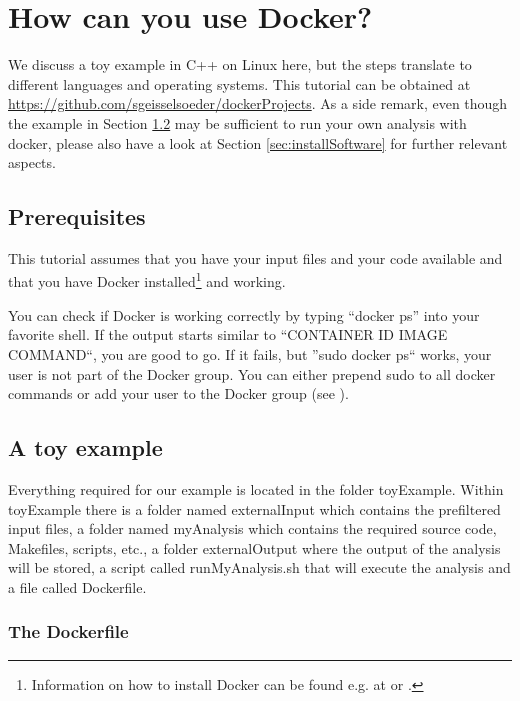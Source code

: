 \documentclass[a4paper, twoside, 11pt]{article}
\begin{document}
\section{How can you use Docker?}

We discuss a toy example in C++ on Linux here, 
but the steps translate to different languages and operating systems. 
This tutorial can be obtained at \url{https://github.com/sgeisselsoeder/dockerProjects}. 
As a side remark, even though the example in Section \ref{sec:toyexample} 
may be sufficient to run your own analysis with docker, 
please also have a look at Section \ref{sec:installSoftware}  
for further relevant aspects.

\subsection{Prerequisites}
\label{sec:isDockerRunning}

This tutorial assumes that you have your input files and your code available and that you have Docker 
installed\footnote{Information on how to install Docker can be found e.g. at 
\cite{digoc:install}
or \cite{dock:install}
.} and working. 

You can check if Docker is working correctly by typing ``docker ps'' into your favorite shell. 
If the output starts similar to ``CONTAINER ID \hspace{0.5cm} IMAGE \hspace{0.5cm} COMMAND``, you are good to go. 
If it fails, but ''sudo docker ps`` works, your user is not part of the Docker group. 
You can either prepend sudo to all docker commands or add your user to the Docker group (see \cite{digoc:install}). 

\subsection{A toy example}
\label{sec:toyexample}
Everything required for our example is located in the folder toyExample. 
Within toyExample there is a folder named externalInput which contains the prefiltered input files, 
a folder named myAnalysis which contains the required source code, Makefiles, scripts, etc., 
a folder externalOutput where the output of the analysis will be stored, 
a script called runMyAnalysis.sh that will execute the analysis and a file called Dockerfile. 

\subsubsection{The Dockerfile}
\label{sec:dockerfile}
\end{document}
